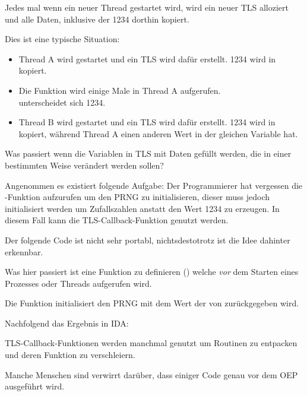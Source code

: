 

Jedes mal wenn ein neuer Thread gestartet wird, wird ein neuer \ac{TLS} alloziert
und alle Daten, inklusive der 1234 dorthin kopiert.

Dies ist eine typische Situation:

\begin{itemize}
\item Thread A wird gestartet und ein \ac{TLS} wird dafür erstellt.
1234 wird in  kopiert.

\item Die Funktion  wird einige Male in Thread A aufgerufen.\\
 unterscheidet sich 1234.

\item Thread B wird gestartet und ein \ac{TLS} wird dafür erstellt.
1234 wird in  kopiert, während Thread A einen anderen Wert
in der gleichen Variable hat.
\end{itemize}


Was passiert wenn die Variablen in \ac{TLS} mit Daten gefüllt werden, die in einer
bestimmten Weise verändert werden sollen?

Angenommen es existiert folgende Aufgabe:
Der Programmierer hat vergessen die -Funktion aufzurufen um den \ac{PRNG} zu initialisieren,
dieser muss jedoch initialisiert werden um  Zufallszahlen anstatt den Wert 1234 zu erzeugen.
In diesem Fall kann die \ac{TLS}-Callback-Funktion genutzt werden.

Der folgende Code ist nicht sehr portabl, nichtsdestotrotz ist die Idee dahinter erkennbar.

Was hier passiert ist eine Funktion zu definieren () welche \emph{vor}
dem Starten eines Prozesses oder Threads aufgerufen wird.

Die Funktion initialisiert den \ac{PRNG} mit dem Wert der von  zurückgegeben wird.



Nachfolgend das Ergebnis in IDA:



TLS-Callback-Funktionen werden manchmal genutzt um Routinen zu entpacken und deren Funktion zu verschleiern.

Manche Menschen sind verwirrt darüber, dass einiger Code genau vor dem \ac{OEP} ausgeführt wird.
